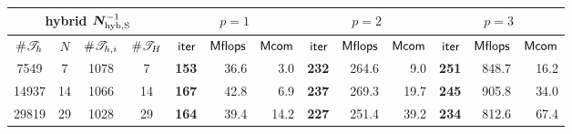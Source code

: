  {\footnotesize
      \tabcolsep 4pt
  \begin{tabular}{cccc|rrr|rrr|rrr}
  \hline
  \multicolumn{4}{c|}{{\small\bf hybrid} $\bm{N}_{\mathrm{hyb,S}}^{-1}$        }  &  \multicolumn{3}{c|}{$p=1$} & \multicolumn{3}{c|}{$p=2$}&   \multicolumn{3}{c}{$p=3$}\\
  \hline
     $ \# {{\mathscr T}_h} $   &
     $ N $ & $ \# {{\mathscr T}_{h,i}} $   &
     $ \# {{\mathscr T}_H} $ & 
     $ \mathsf{iter} $ & $ \mathsf{Mflops} $ & $ \mathsf{Mcom} $ & 
     $ \mathsf{iter} $ & $ \mathsf{Mflops} $ & $ \mathsf{Mcom} $ & 
     $ \mathsf{iter} $ & $ \mathsf{Mflops} $ & $ \mathsf{Mcom} $ \\ 
  \hline
    7549 &        7 &     1078 &        7
& {\bf      153}  &       36.6 &        3.0
& {\bf      232}  &      264.6 &        9.0
& {\bf      251}  &      848.7 &       16.2
 \\
   14937 &       14 &     1066 &       14
& {\bf      167}  &       42.8 &        6.9
& {\bf      237}  &      269.3 &       19.7
& {\bf      245}  &      905.8 &       34.0
 \\
   29819 &       29 &     1028 &       29
& {\bf      164}  &       39.4 &       14.2
& {\bf      227}  &      251.4 &       39.2
& {\bf      234}  &      812.6 &       67.4
 \\
  \hline
  \end{tabular}
 }
